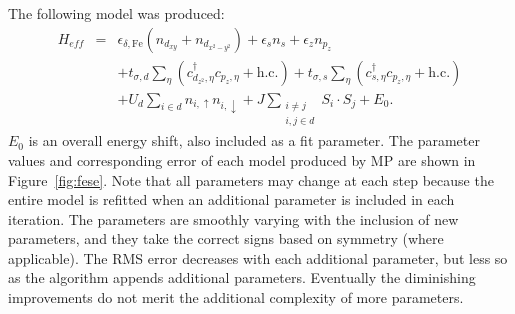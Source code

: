 The following model was produced:
\begin{eqnarray}
  H_{eff} &=& \epsilon_{\delta,\mathrm{Fe}} (n_{d_{xy}} + n_{d_{x^2-y^2}}) + \epsilon_s n_{s}+\epsilon_{z} n_{p_z} \nonumber \\
          &&+ t_{\sigma,d} \sum_{\eta} \left( c_{d_{z^2},\eta}^{\dagger} c_{p_z,\eta} + \text{h.c.} \right)+t_{\sigma,s} \sum_{\eta} \left(c_{s,\eta}^{\dagger}  c_{p_z,\eta} + \text{h.c.} \right)
              \nonumber \\
          &&+ U_d \sum_{i \in d} n_{i,\uparrow} n_{i,\downarrow} + J \sum_{\substack{i\ne j \\i,j \in d}} S_i \cdot S_j + E_0. \label{eq:fesemodel}
\end{eqnarray}
$E_0$ is an overall energy shift, also included as a fit parameter.
The parameter values and corresponding error of each model produced by MP are shown in Figure~\ref{fig:fese}.
Note that all parameters may change at each step because the entire model is refitted when an additional parameter is included in each iteration.
The parameters are smoothly varying with the inclusion of new parameters, and they take the correct signs based on symmetry (where applicable). 
The RMS error decreases with each additional parameter, but less so as the algorithm appends additional parameters. 
Eventually the diminishing improvements do not merit the additional complexity of more parameters.

